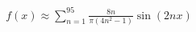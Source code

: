 \documentclass[preview]{standalone}
\begin{document}
\begin{align*}
f(x) \approx \sum_{n=1}^{95} \frac{8n}{\pi(4n^2-1)} \sin(2nx)
\end{align*}
\end{document}
